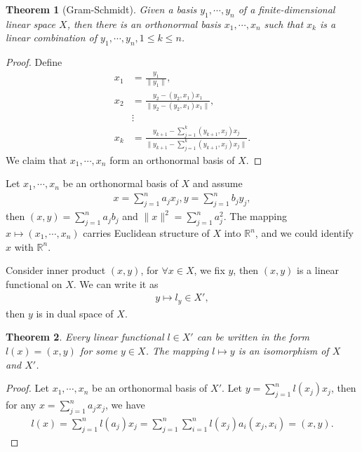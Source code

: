 \documentclass[11pt]{book}
\newtheorem{theorem}{Theorem}[chapter]
\theoremstyle{definition}
\numberwithin{equation}{chapter}
\begin{document}
\begin{theorem}[Gram-Schmidt]
Given a basis $y_1,\cdots,y_n$ of a finite-dimensional linear space $X$, then there is an orthonormal basis $x_1,\cdots,x_n$ such that $x_k$ is a linear combination of $y_1,\cdots,y_n, 1\leq k \leq n$.
\end{theorem}
\begin{proof}
Define
\begin{align*}
    x_1 & = \frac{y_1}{\|y_1\|}, \\
    x_2 & = \frac{y_2 - (y_2,x_1)x_1}{\|y_2 - (y_2,x_1)x_1\|}, \\
    & \vdots \\
    x_k & = \frac{y_{k+1} - \sum^k_{j=1}(y_{k+1},x_j)x_j}{\|y_{k+1} - \sum^k_{j=1}(y_{k+1},x_j)x_j\|}.
\end{align*}
We claim that $x_1,\cdots,x_n$ form an orthonormal basis of $X$.
\end{proof}

\medskip

Let $x_1,\cdots,x_n$ be an orthonormal basis of $X$ and assume 
\begin{align*}
    x = \sum^n_{j=1} a_j x_j, y = \sum^n_{j=1} b_j y_j,
\end{align*}
then $(x,y) = \sum^n_{j=1} a_jb_j$ and $\|x\|^2 = \sum^n_{j=1} a_j^2$.  The mapping $x\mapsto (x_1,\cdots,x_n)$ carries Euclidean structure of $X$ into $\mathbb{R}^n$, and we could identify $x$ with $\mathbb{R}^n$.

Consider inner product $(x,y)$, for $\forall x\in X$, we fix $y$, then $(x,y)$ is a linear functional on $X$. We can write it as 
\begin{align*}
    y \mapsto l_y \in X',
\end{align*}
then $y$ is in dual space of $X$.

\medskip

\begin{theorem}
Every linear functional $l\in X'$ can be written in the form $l(x) = (x,y)$ for some $y\in X$. The mapping $l \mapsto y$ is an isomorphism of $X$ and $X'$.
\end{theorem}
\begin{proof}
Let $x_1,\cdots,x_n$ be an orthonormal basis of $X'$. Let $y = \sum^n_{j=1}l(x_j)x_j$, then for any $x = \sum^n_{j=1}a_jx_j$, we have
\begin{align*}
    l(x) = \sum^n_{j=1}l(a_j) x_j = \sum^n_{j=1}\sum^n_{i=1} l(x_j) a_i (x_j, x_i) = (x,y).
\end{align*}
\end{proof}
\end{document}
